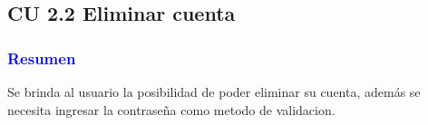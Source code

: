 
\newpage
\subsection{CU 2.2 Eliminar cuenta}

\subsubsection{\textcolor{blue}{Resumen}}
Se brinda al usuario la posibilidad de poder eliminar su cuenta, además se necesita ingresar la contraseña como metodo de validacion.
